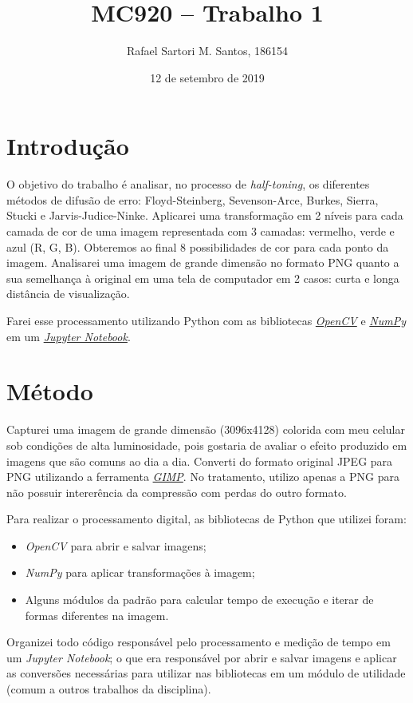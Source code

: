\documentclass[brazilian,a4paper,twocolumn]{article}
\title{MC920 -- Trabalho 1}
\author{Rafael Sartori M. Santos, 186154}
\date{12 de setembro de 2019}
\begin{document}
\maketitle

\section{Introdução}

    O objetivo do trabalho é analisar, no processo de \textit{half-toning}, os diferentes métodos de difusão de erro: Floyd-Steinberg, Sevenson-Arce, Burkes, Sierra, Stucki e Jarvis-Judice-Ninke. Aplicarei uma transformação em 2 níveis para cada camada de cor de uma imagem representada com 3 camadas: vermelho, verde e azul (R, G, B). Obteremos ao final $8$ possibilidades de cor para cada ponto da imagem. Analisarei uma imagem de grande dimensão no formato PNG quanto a sua semelhança à original em uma tela de computador em 2 casos: curta e longa distância de visualização.

    Farei esse processamento utilizando Python com as bibliotecas \href{https://opencv.org/}{\emph{OpenCV}} e \href{https://numpy.org/}{\emph{NumPy}} em um \href{https://jupyter.org/}{\emph{Jupyter Notebook}}.


\section{Método}

    Capturei uma imagem de grande dimensão (3096x4128) colorida com meu celular sob condições de alta luminosidade, pois gostaria de avaliar o efeito produzido em imagens que são comuns ao dia a dia. Converti do formato original JPEG para PNG utilizando a ferramenta \href{https://www.gimp.org/}{\emph{GIMP}}. No tratamento, utilizo apenas a PNG para não possuir intererência da compressão com perdas do outro formato.

    Para realizar o processamento digital, as bibliotecas de Python que utilizei foram:
    \begin{itemize}
        \item \emph{OpenCV} para abrir e salvar imagens;
        \item \emph{NumPy} para aplicar transformações à imagem;
        \item Alguns módulos da padrão para calcular tempo de execução e iterar de formas diferentes na imagem.
    \end{itemize}
    Organizei todo código responsável pelo processamento e medição de tempo em um \emph{Jupyter Notebook}; o que era responsável por abrir e salvar imagens e aplicar as conversões necessárias para utilizar nas bibliotecas em um módulo de utilidade (comum a outros trabalhos da disciplina).
\end{document}
